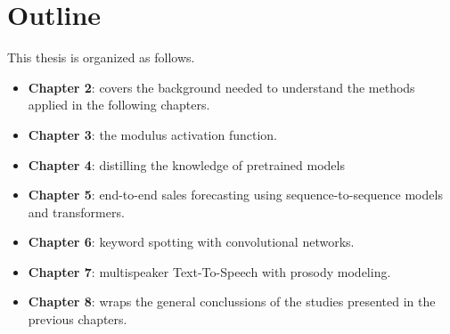 \section{Outline}
This thesis is organized as follows.

\begin{itemize}
	\item \textbf{Chapter 2}: covers the background needed to understand the methods applied in the following chapters.
	\item \textbf{Chapter 3}: the modulus activation function.
	\item \textbf{Chapter 4}: distilling the knowledge of pretrained models
	\item \textbf{Chapter 5}: end-to-end sales forecasting using sequence-to-sequence models and transformers.
	\item \textbf{Chapter 6}: keyword spotting with convolutional networks.
	\item \textbf{Chapter 7}: multispeaker Text-To-Speech with prosody modeling.
	\item \textbf{Chapter 8}: wraps the general conclussions of the studies presented in the previous chapters.
\end{itemize}


